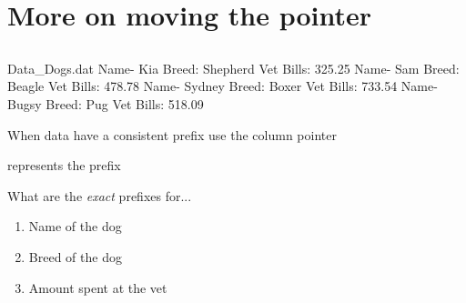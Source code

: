 
\section[More on moving the pointer]{More on moving the pointer}
\subsection{}
\begin{frame}
\end{frame}


\begin{frame}[fragile]
\begin{craw}{.1}{Data\_Dogs.dat}
  Name- Kia Breed: Shepherd Vet Bills: 325.25
     Name- Sam Breed: Beagle   Vet Bills: 478.78
   Name- Sydney    Breed: Boxer   Vet Bills: 733.54
 Name- Bugsy   Breed: Pug  Vet Bills: 518.09
\end{craw}
\bi
\item[]
\item When data have a consistent prefix use the  column pointer
\item {} represents the prefix
\ei
\emp
{} \hspace{0.05in} \emp
{}
\begin{clicker}{What are the \emph{exact} prefixes for...}
\begin{enumerate}
\item Name of the dog
\item Breed of the dog
\item Amount spent at the vet
\end{enumerate}
\end{clicker}
\emp
\end{frame}



